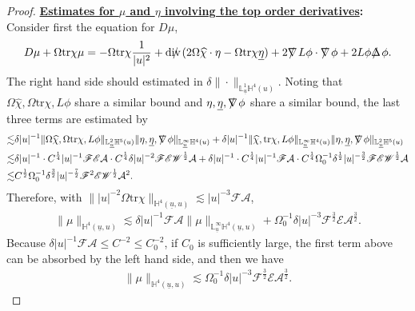 \documentclass[11pt,reqno]{amsart}
\theoremstyle{definition}
\numberwithin{equation}{section}
\newcommand{\tr}{\mathrm{tr}}
\renewcommand{\L}{\mathbb{L}}
\renewcommand{\H}{\mathbb{H}}
\def\chih{\widehat{\chi}}
\def\etab{\underline{\eta}}
\def\tr{\mathrm{tr}}
\def\ub{\underline{u}}
\def\nablas{\mbox{$\nabla \mkern -13mu /$ }}
\def\Deltas{\mbox{$\Delta \mkern -13mu /$ }}
\def\divs{\mbox{$\mathrm{div} \mkern -13mu /$ }}
\def\ds{\mbox{$\nabla \mkern -13mu /$ }}
\begin{document}
\begin{proof}
{\bf \underline{Estimates for $\mu$ and $\eta$ involving the top order derivatives}:} Consider first the equation for $D\mu$,
\begin{equation}\label{equ-Dmu}D\mu+\Omega\tr\chi\mu=-\Omega\tr\chi\frac{1}{|u|^2}+\divs(2\Omega\chih\cdot\eta-\Omega\tr\chi\etab)+2\nablas L\phi\cdot\ds\phi+2L\phi\Deltas\phi.\end{equation}
The right hand side should estimated in $\delta\|\cdot\|_{\L^1_{\ub}\H^4(u)}$. Noting that $\Omega\chih,\Omega\tr\chi, L\phi$ share a similar bound and $\eta, \etab,\nablas\phi$ share a similar bound, the last three terms are estimated by
\begin{align*}
\lesssim&\delta|u|^{-1}\|\Omega\chih,\Omega\tr\chi,L\phi\|_{\L^2_{\ub}\H^5(u)}\|\eta,\etab,\nablas\phi\|_{\L^\infty_{\ub}\H^4(u)}+\delta|u|^{-1}\|\chih,\tr\chi,L\phi\|_{\L^\infty_{\ub}\H^4(u)}\|\eta,\etab,\nablas\phi\|_{\L^2_{\ub}\H^5(u)}\\
\lesssim&\delta|u|^{-1}\cdot C^{\frac{1}{4}}|u|^{-1}\mathscr{F}\mathscr{E}\mathcal{A}\cdot C^{\frac{1}{4}}\delta|u|^{-2}\mathscr{F}\mathscr{E}\mathscr{W}^{\frac{1}{2}}\mathcal{A}+\delta|u|^{-1}\cdot C^{\frac{1}{4}}|u|^{-1}\mathscr{F}\mathcal{A}\cdot C^{\frac{1}{4}}\Omega_0^{-1}\delta^{\frac{1}{2}}|u|^{-\frac{3}{2}}\mathscr{F}\mathscr{E}\mathscr{W}^{\frac{1}{2}}\mathcal{A}\\
\lesssim& C^{\frac{1}{2}}\Omega_0^{-1}\delta^{\frac{3}{2}}|u|^{-\frac{7}{2}}\mathscr{F}^2\mathscr{E}\mathscr{W}^{\frac{1}{2}}\mathcal{A}^2.
\end{align*}
Therefore, with $\||u|^{-2}\Omega\tr\chi\|_{\H^4(\ub,u)}\lesssim|u|^{-3}\mathscr{F}\mathcal{A}$, 
\begin{align*}
\|\mu\|_{\H^4(\ub,u)}\lesssim\delta|u|^{-1}\mathscr{F}\mathcal{A}\|\mu\|_{\L^\infty_{\ub}\H^4(\ub,u)}+\Omega_0^{-1}\delta|u|^{-3}\mathscr{F}^{\frac{3}{2}}\mathscr{E}\mathcal{A}^{\frac{3}{2}}.\end{align*}
Because $\delta|u|^{-1}\mathscr{F}\mathcal{A}\le C^{-2}\le C_0^{-2}$, if $C_0$ is sufficiently large, the first term above can be absorbed by the left hand side, and then we have
\begin{align}\label{estimate-mu}
\|\mu\|_{\H^4(\ub,u)}\lesssim\Omega_0^{-1}\delta|u|^{-3}\mathscr{F}^{\frac{3}{2}}\mathscr{E}\mathcal{A}^{\frac{3}{2}}.\end{align}


\end{proof}
\end{document}
